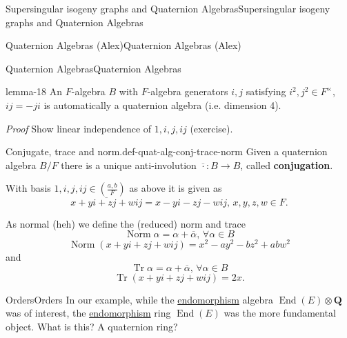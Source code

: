 \documentclass[10pt,]{book}
\makeatletter
\newcommand{\terminology}[1]{\textbf{#1}}
\renewcommand*{\proofname}{Proof}
\renewenvironment{proof}[1][\proofname]{\par
  \pushQED{\qed}%
  \normalfont \topsep6\p@\@plus6\p@\relax
  \trivlist
  \item\relax
    {\itshape
    #1\@addpunct{.}}\hspace\labelsep\ignorespaces
}{%
  \popQED\endtrivlist\@endpefalse
}
\numberwithin{equation}{section}
\newcommand{\legendre}[2]{\left(\frac{#1}{#2}\right)}
\newcommand{\QQ}{\mathbf{Q}}
\DeclareMathOperator{\End}{End}
\DeclareMathOperator{\norm}{Norm}
\DeclareMathOperator{\trace}{Tr}
\makeatother
\begin{document}
\begin{chapterptx}{Supersingular isogeny graphs and Quaternion Algebras}{}{Supersingular isogeny graphs and Quaternion Algebras}{}{}
\begin{sectionptx}{Quaternion Algebras (Alex)}{}{Quaternion Algebras (Alex)}{}{}
\begin{subsectionptx}{Quaternion Algebras}{}{Quaternion Algebras}{}{}
\begin{introduction}{}
\begin{lemma}{}{}{lemma-18}%
\hypertarget{p-899}{}%
An \(F\)-algebra \(B\) with \(F\)-algebra generators \(i,j\) satisfying \(i^2,j^2\in F^\times\), \(ij = -ji\) is automatically a quaternion algebra (i.e. dimension 4).%
\end{lemma}
\begin{proof}\hypertarget{proof-106}{}
\hypertarget{p-900}{}%
Show linear independence of \(1,i,j,ij\) (exercise).%
\end{proof}
\begin{definition}{Conjugate, trace and norm.}{def-quat-alg-conj-trace-norm}%
\hypertarget{p-901}{}%
Given a quaternion algebra \(B/F\) there is a unique anti-involution \(\overline \cdot \colon B \to B\), called \terminology{conjugation}.%
\par
\hypertarget{p-902}{}%
With basis \(1,i,j,ij\in \legendre{a,b}{F}\) as above it is given as%
\begin{equation*}
\overline {x + yi + zj + w ij} = x - yi - zj - w ij,\,x,y,z,w\in F\text{.}
\end{equation*}
%
\par
\hypertarget{p-903}{}%
As normal (heh) we define the (reduced) norm and trace%
\begin{equation*}
\norm \alpha =  \alpha + \overline \alpha,\,\forall \alpha \in B
\end{equation*}
%
\begin{equation*}
\norm(x + yi + zj + w ij) = x^2 - ay^2 - b z^2 + ab w^2
\end{equation*}
and%
\begin{equation*}
\trace \alpha =  \alpha + \overline \alpha,\,\forall \alpha \in B
\end{equation*}
%
\begin{equation*}
\trace (x + yi + zj + w ij) = 2x\text{.}
\end{equation*}
%
\end{definition}
\end{introduction}%
%
%
\typeout{************************************************}
\typeout{************************************************}
%
\begin{subsubsectionptx}{Orders}{}{Orders}{}{}\label{subsubsection-1}
\hypertarget{p-904}{}%
In our example, while the \hyperref[def-supersing-isog-endo]{endomorphism} algebra \(\End(E)\otimes \QQ\) was of interest, the \hyperref[def-supersing-isog-endo]{endomorphism} ring \(\End(E)\) was the more fundamental object. What is this? A quaternion ring?%

\end{subsubsectionptx}
\end{subsectionptx}
\end{sectionptx}
\end{chapterptx}
\end{document}
